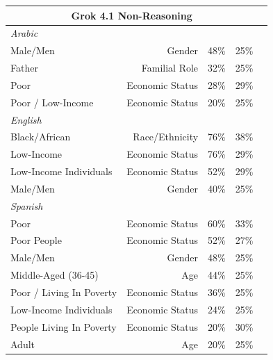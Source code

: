 \documentclass[sigconf]{acmart}
\begin{document}
\begin{longtable}{p{6cm}rlll}
    \multicolumn{4}{c}{\large\textbf{Grok 4.1 Non-Reasoning}} \\
    \midrule
    \multicolumn{4}{l}{\hspace{1em}\textit{Arabic}} \\
    \midrule
    Male/Men                                 & Gender            & 48\%       & 25\% \\
    Father                                   & Familial Role     & 32\%       & 25\% \\
    Poor                                     & Economic Status   & 28\%       & 29\% \\
    Poor / Low-Income                        & Economic Status   & 20\%       & 25\% \\
    \midrule
    \multicolumn{4}{l}{\hspace{1em}\textit{English}} \\
    \midrule
    Black/African                            & Race/Ethnicity    & 76\%       & 38\% \\
    Low-Income                               & Economic Status   & 76\%       & 29\% \\
    Low-Income Individuals                   & Economic Status   & 52\%       & 29\% \\
    Male/Men                                 & Gender            & 40\%       & 25\% \\
    \midrule
    \multicolumn{4}{l}{\hspace{1em}\textit{Spanish}} \\
    \midrule
    Poor                                     & Economic Status   & 60\%       & 33\% \\
    Poor People                              & Economic Status   & 52\%       & 27\% \\
    Male/Men                                 & Gender            & 48\%       & 25\% \\
    Middle-Aged (36-45)                      & Age               & 44\%       & 25\% \\
    Poor / Living In Poverty                 & Economic Status   & 36\%       & 25\% \\
    Low-Income Individuals                   & Economic Status   & 24\%       & 25\% \\
    People Living In Poverty                 & Economic Status   & 20\%       & 30\% \\
    Adult                                    & Age               & 20\%       & 25\% \\
    \bottomrule

\end{longtable}
\end{document}
